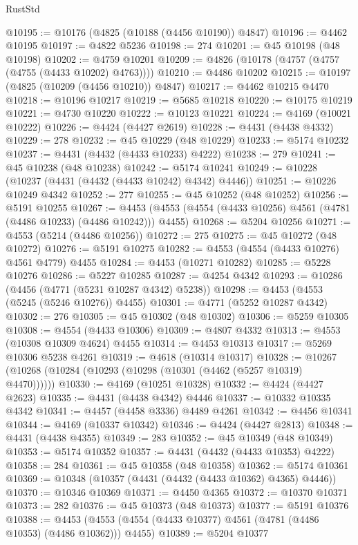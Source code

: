 \begin{lexlean}{RustStd}
\begin{coremodule}
@10195 := @10176 (@4825 (@10188 (@4456 @10190)) @4847)
@10196 := @4462 @10195
@10197 := @4822 @5236
@10198 := 274
@10201 := @45 @10198 (@48 @10198)
@10202 := @4759 @10201
@10209 := @4826 (@10178 (@4757 (@4757 (@4755 (@4433 @10202) @4763))))
@10210 := @4486 @10202
@10215 := @10197 (@4825 (@10209 (@4456 @10210)) @4847)
@10217 := @4462 @10215 @4470
@10218 := @10196 @10217
@10219 := @5685 @10218
@10220 := @10175 @10219
@10221 := @4730 @10220
@10222 := @10123 @10221
@10224 := @4169 (@10021 @10222)
@10226 := @4424 (@4427 @2619)
@10228 := @4431 (@4438 @4332)
@10229 := 278
@10232 := @45 @10229 (@48 @10229)
@10233 := @5174 @10232
@10237 := @4431 (@4432 (@4433 @10233) @4222)
@10238 := 279
@10241 := @45 @10238 (@48 @10238)
@10242 := @5174 @10241
@10249 := @10228 (@10237 (@4431 (@4432 (@4433 @10242) @4342) @4446))
@10251 := @10226 @10249 @4342
@10252 := 277
@10255 := @45 @10252 (@48 @10252)
@10256 := @5191 @10255
@10267 := @4453 (@4553 (@4554 (@4433 @10256) @4561 (@4781 (@4486 @10233) (@4486 @10242))) @4455)
@10268 := @5204 @10256
@10271 := @4553 (@5214 (@4486 @10256))
@10272 := 275
@10275 := @45 @10272 (@48 @10272)
@10276 := @5191 @10275
@10282 := @4553 (@4554 (@4433 @10276) @4561 @4779) @4455
@10284 := @4453 (@10271 @10282)
@10285 := @5228 @10276
@10286 := @5227 @10285
@10287 := @4254 @4342
@10293 := @10286 (@4456 (@4771 (@5231 @10287 @4342) @5238))
@10298 := @4453 (@4553 (@5245 (@5246 @10276)) @4455)
@10301 := @4771 (@5252 @10287 @4342)
@10302 := 276
@10305 := @45 @10302 (@48 @10302)
@10306 := @5259 @10305
@10308 := @4554 (@4433 @10306)
@10309 := @4807 @4332
@10313 := @4553 (@10308 @10309 @4624) @4455
@10314 := @4453 @10313
@10317 := @5269 @10306 @5238 @4261
@10319 := @4618 (@10314 @10317)
@10328 := @10267 (@10268 (@10284 (@10293 (@10298 (@10301 (@4462 (@5257 @10319) @4470))))))
@10330 := @4169 (@10251 @10328)
@10332 := @4424 (@4427 @2623)
@10335 := @4431 (@4438 @4342) @4446
@10337 := @10332 @10335 @4342
@10341 := @4457 (@4458 @3336) @4489 @4261
@10342 := @4456 @10341
@10344 := @4169 (@10337 @10342)
@10346 := @4424 (@4427 @2813)
@10348 := @4431 (@4438 @4355)
@10349 := 283
@10352 := @45 @10349 (@48 @10349)
@10353 := @5174 @10352
@10357 := @4431 (@4432 (@4433 @10353) @4222)
@10358 := 284
@10361 := @45 @10358 (@48 @10358)
@10362 := @5174 @10361
@10369 := @10348 (@10357 (@4431 (@4432 (@4433 @10362) @4365) @4446))
@10370 := @10346 @10369
@10371 := @4450 @4365
@10372 := @10370 @10371
@10373 := 282
@10376 := @45 @10373 (@48 @10373)
@10377 := @5191 @10376
@10388 := @4453 (@4553 (@4554 (@4433 @10377) @4561 (@4781 (@4486 @10353) (@4486 @10362))) @4455)
@10389 := @5204 @10377

\end{coremodule}
\end{lexlean}
